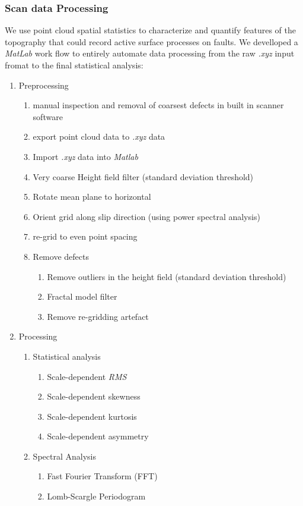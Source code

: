 \documentclass[12pt,a4paper]{article}
\begin{document}
	\subsubsection{Scan data Processing}

We use point cloud spatial statistics to characterize and quantify features of the topography that could record active surface processes on faults. We develloped a \textit{MatLab} work flow to entirely automate data processing from the raw \textit{.xyz} input fromat to the final statistical analysis:

\begin{enumerate}
	\item Preprocessing
	\begin{enumerate}
		\item manual inspection and removal of coarsest defects in built in scanner software
		\item export point cloud data to \textit{.xyz} data
		\item Import \textit{.xyz} data into \textit{Matlab}
		\item Very coarse Height field filter (standard deviation threshold)
		\item Rotate mean plane to horizontal
		\item Orient grid along slip direction (using power spectral analysis)
		\item re-grid to even point spacing
		\item Remove defects
		\begin{enumerate}
			\item Remove outliers in the height field (standard deviation threshold)
			\item Fractal model filter
			\item Remove re-gridding artefact 
		\end{enumerate}
	\end{enumerate}
	\item Processing
	\begin{enumerate}
		\item Statistical analysis
		\begin{enumerate}
			\item Scale-dependent \textit{RMS}
			\item Scale-dependent skewness
			\item Scale-dependent kurtosis
			\item Scale-dependent asymmetry
		\end{enumerate}
		\item Spectral Analysis
		\begin{enumerate}
			\item Fast Fourier Transform (FFT)
			\item Lomb-Scargle Periodogram
		\end{enumerate}
	\end{enumerate}
\end{enumerate}
\end{document}
